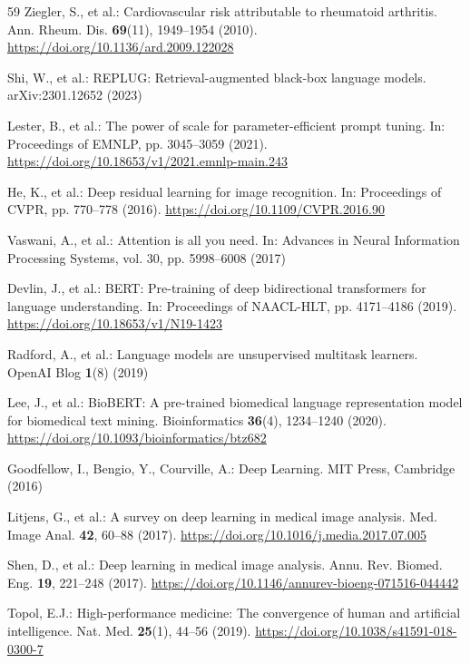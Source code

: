 \documentclass[AMA,STIX1COL,]{WileyNJD-v2}
\begin{document}
\begin{thebibliography}{59}
Ziegler, S., et al.: Cardiovascular risk attributable to rheumatoid arthritis. Ann. Rheum. Dis. \textbf{69}(11), 1949--1954 (2010). \url{https://doi.org/10.1136/ard.2009.122028}

Shi, W., et al.: REPLUG: Retrieval-augmented black-box language models. arXiv:2301.12652 (2023)

Lester, B., et al.: The power of scale for parameter-efficient prompt tuning. In: Proceedings of EMNLP, pp. 3045--3059 (2021). \url{https://doi.org/10.18653/v1/2021.emnlp-main.243}

He, K., et al.: Deep residual learning for image recognition. In: Proceedings of CVPR, pp. 770--778 (2016). \url{https://doi.org/10.1109/CVPR.2016.90}

Vaswani, A., et al.: Attention is all you need. In: Advances in Neural Information Processing Systems, vol. 30, pp. 5998--6008 (2017)

Devlin, J., et al.: BERT: Pre-training of deep bidirectional transformers for language understanding. In: Proceedings of NAACL-HLT, pp. 4171--4186 (2019). \url{https://doi.org/10.18653/v1/N19-1423}

Radford, A., et al.: Language models are unsupervised multitask learners. OpenAI Blog \textbf{1}(8) (2019)

Lee, J., et al.: BioBERT: A pre-trained biomedical language representation model for biomedical text mining. Bioinformatics \textbf{36}(4), 1234--1240 (2020). \url{https://doi.org/10.1093/bioinformatics/btz682}

Goodfellow, I., Bengio, Y., Courville, A.: Deep Learning. MIT Press, Cambridge (2016)

Litjens, G., et al.: A survey on deep learning in medical image analysis. Med. Image Anal. \textbf{42}, 60--88 (2017). \url{https://doi.org/10.1016/j.media.2017.07.005}

Shen, D., et al.: Deep learning in medical image analysis. Annu. Rev. Biomed. Eng. \textbf{19}, 221--248 (2017). \url{https://doi.org/10.1146/annurev-bioeng-071516-044442}

Topol, E.J.: High-performance medicine: The convergence of human and artificial intelligence. Nat. Med. \textbf{25}(1), 44--56 (2019). \url{https://doi.org/10.1038/s41591-018-0300-7}


\end{thebibliography}
\end{document}
